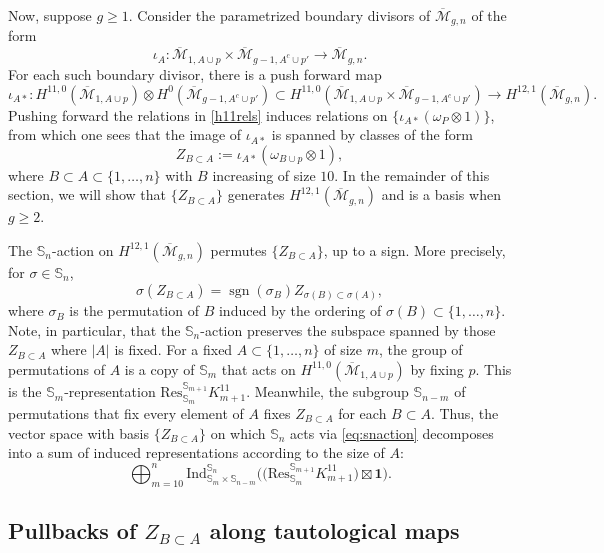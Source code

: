 \documentclass[12pt]{amsart}
\theoremstyle{definition}
\numberwithin{equation}{section}
\renewcommand{\ss}{\mathbb{S}}
\newcommand{\M}{\mathcal{M}}
\newcommand{\sgn}{\operatorname{sgn}}
\newcommand{\Ind}{\mathrm{Ind}}
\newcommand{\Mb}{\overline{\M}}
\theoremstyle{definition} %
\theoremstyle{remark}
\begin{document}
Now, suppose $g \geq 1$. Consider the parametrized boundary divisors of $\Mb_{g,n}$ of the form
\[\iota_{A} \colon \Mb_{1, A \cup p} \times \Mb_{g-1,A^c \cup p'} \to \Mb_{g,n}.\]
For each such boundary divisor, there is a push forward map
\[
\iota_{A*} \colon H^{11,0}(\Mb_{1,A\cup p}) \otimes H^0(\Mb_{g-1,A^c \cup p'}) \subset H^{11,0}(\Mb_{1, A \cup p} \times \Mb_{g-1,A^c \cup p'}) \to H^{12,1}(\Mb_{g,n}). 
\]
Pushing forward the relations in \eqref{h11rels} induces relations on $\{\iota_{A*}(\omega_{P}\otimes 1)\}$, from which one sees that the image of $\iota_{A*}$ is spanned by classes of the form
\begin{equation} \label{zdef} 
Z_{B \subset A} := \iota_{A*}(\omega_{B \cup p}\otimes 1),
\end{equation}
where $B \subset A \subset \{1, \ldots, n\}$ with $B$ increasing of size $10$. In the remainder of this section, we will show that $\{Z_{B\subset A}\}$ generates $H^{12,1}(\Mb_{g,n})$ and is a basis when $g \geq 2$.

The $\ss_n$-action on $H^{12,1}(\Mb_{g,n})$ permutes $\{Z_{B \subset A}\}$, up to a sign. More precisely, for $\sigma \in \ss_n$, 
\begin{equation}\label{eq:snaction}
\sigma(Z_{B \subset A}) = \sgn(\sigma_B) Z_{\sigma(B) \subset \sigma(A)},
\end{equation}
where $\sigma_B$ is the permutation of $B$ induced by the ordering of $\sigma(B) \subset \{1, \ldots, n\}$. Note, in particular, that the $\ss_n$-action preserves the subspace spanned by those $Z_{B \subset A}$ where $|A|$ is fixed. For a fixed $A \subset \{1, \ldots, n\}$ of size $m$, the group of permutations of $A$ 
is a copy of $\mathbb{S}_m$ that acts
on $H^{11,0}(\Mb_{1,A \cup p})$ by fixing $p$. This is the $\mathbb{S}_m$-representation $\mathrm{Res}^{\ss_{m+1}}_{\ss_m} K^{11}_{m+1}$. 
Meanwhile, the subgroup $\mathbb{S}_{n-m}$ of permutations that fix every element of $A$ fixes $Z_{B \subset A}$ for each $B \subset A$. Thus, the vector space with basis $\{Z_{B \subset A}\}$ on which $\ss_n$ acts via \eqref{eq:snaction} decomposes into a sum of induced representations according to the size of $A$:
\[
\bigoplus_{m = 10}^n \Ind_{\ss_m \times \ss_{n-m}}^{\ss_n} \Big(\big(\mathrm{Res}^{\ss_{m+1}}_{\ss_m}K^{11}_{m+1}\big) \boxtimes \mathbf{1}\Big).
\]


\subsection{Pullbacks of \texorpdfstring{$Z_{B \subset A}$}{ZBA} along tautological maps} \label{tm}
\end{document}
